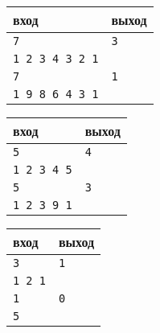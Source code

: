 \documentclass{article}
\begin{document}
\begin{multicols}{3}
\begin{center}
\begin{tabular}{ l | l }
 вход & выход \\ \hline
 \texttt{7} & \texttt{3}  \\  
 \texttt{1 2 3 4 3 2 1} & \\\hline
 \texttt{7} & \texttt{1}  \\  
 \texttt{1 9 8 6 4 3 1} & \\
\end{tabular}
\end{center}

\begin{center}
\begin{tabular}{ l | l }
 вход & выход \\ \hline
 \texttt{5} & \texttt{4}  \\  
 \texttt{1 2 3 4 5} & \\ \hline
 \texttt{5} & \texttt{3}  \\  
 \texttt{1 2 3 9 1} & \\
\end{tabular}
\end{center}

\begin{center}
\begin{tabular}{ l | l }
 вход & выход \\ \hline
 \texttt{3} & \texttt{1}  \\  
 \texttt{1 2 1} & \\ \hline
 \texttt{1} & \texttt{0}  \\  
 \texttt{5} & \\
\end{tabular}
\end{center}
\end{multicols}
\end{document}
